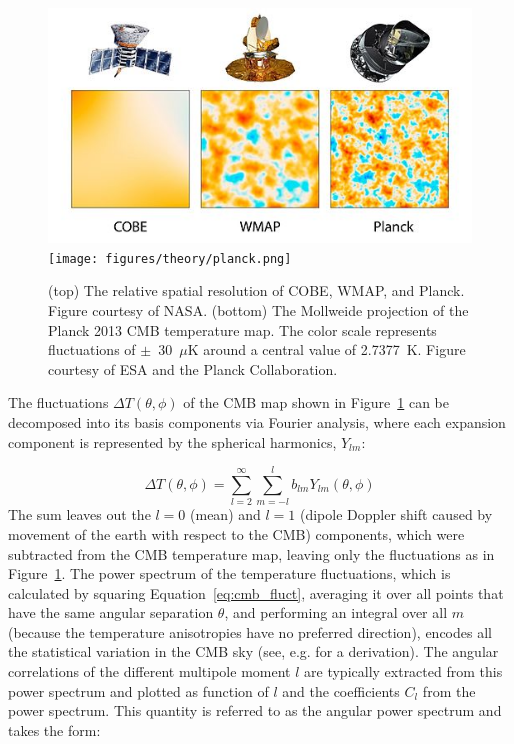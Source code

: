 \begin{figure}[htbp]
\begin{center}
\includegraphics[width=.6\textwidth]{figures/theory/satellites.jpg}
\texttt{[image: figures/theory/planck.png]}
\caption{(top) The relative spatial resolution of COBE, WMAP, and Planck. Figure courtesy of NASA. (bottom) The Mollweide projection of the Planck 2013 CMB temperature map. The color scale represents fluctuations of $\pm$~30~$\mu$K around a central value of 2.7377~K. Figure courtesy of ESA and the Planck Collaboration. }
\label{fig:cmb}
\end{center}
\end{figure}

The fluctuations $\Delta T(\theta, \phi)$ of the \ac{CMB} map shown in Figure~\ref{fig:cmb} can be decomposed into its basis components via Fourier analysis, where each expansion component is represented by the spherical harmonics, $Y_{lm}$:

\begin{equation}
\label{eq:cmb_fluct}
\Delta T(\theta, \phi) = \sum_{l=2}^{\infty} \sum_{m=-l}^{l} b_{lm} Y_{lm}(\theta, \phi)
\end{equation}
The sum leaves out the $l=0$ (mean) and $l=1$ (dipole Doppler shift caused by movement of the earth with respect to the \ac{CMB}) components, which were subtracted from the \ac{CMB} temperature map, leaving only the fluctuations as in Figure~\ref{fig:cmb}. The power spectrum of the temperature fluctuations, which is calculated by squaring Equation~\ref{eq:cmb_fluct}, averaging it over all points that have the same angular separation $\theta$, and performing an integral over all $m$ (because the temperature anisotropies have no preferred direction), encodes all the statistical variation in the \ac{CMB} sky (see, e.g. \cite{Hu2008} for a derivation). The angular correlations of the different multipole moment $l$ are typically extracted from this power spectrum and plotted as function of $l$ and the coefficients $C_{l}$ from the power spectrum. This quantity is referred to as the angular power spectrum and takes the form:

